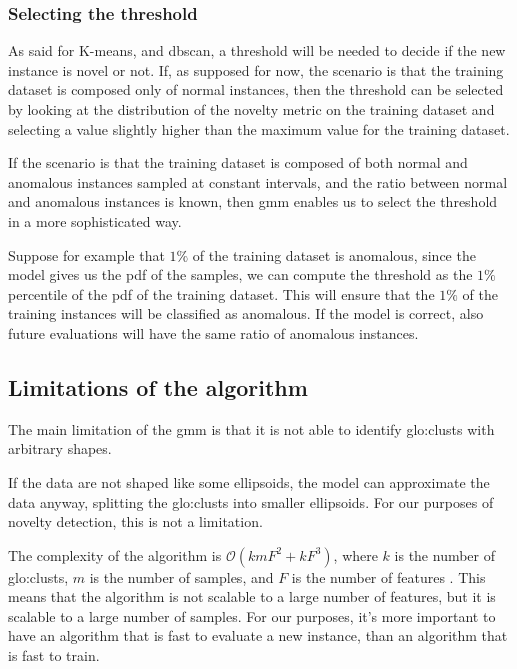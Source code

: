 \subsubsection{Selecting the threshold}
As said for K-means, and \gls{dbscan}, a threshold will be needed to decide if the new instance is novel or not. If, as supposed for now, the scenario is that the training dataset is composed only of normal instances, then the threshold can be selected by looking at the distribution of the novelty metric on the training dataset and selecting a value slightly higher than the maximum value for the training dataset.

If the scenario is that the training dataset is composed of both normal and anomalous instances sampled at constant intervals, and the ratio between normal and anomalous instances is known, then \gls{gmm} enables us to select the threshold in a more sophisticated way.

Suppose for example that $1\%$ of the training dataset is anomalous, since the model gives us the \gls{pdf} of the samples, we can compute the threshold as the $1\%$ percentile of the \gls{pdf} of the training dataset. This will ensure that the $1\%$ of the training instances will be classified as anomalous. If the model is correct, also future evaluations will have the same ratio of anomalous instances.

\subsection{Limitations of the algorithm}
The main limitation of the \gls{gmm} is that it is not able to identify \gls{glo:clust}s with arbitrary shapes.

If the data are not shaped like some ellipsoids, the model can approximate the data anyway, splitting the \gls{glo:clust}s into smaller ellipsoids. For our purposes of novelty detection, this is not a limitation.

The complexity of the algorithm is $\mathcal{O}(kmF^2+kF^3)$, where $k$ is the number of \gls{glo:clust}s, $m$ is the number of samples, and $F$ is the number of features . This means that the algorithm is not scalable to a large number of features, but it is scalable to a large number of samples.
For our purposes, it's more important to have an algorithm that is fast to evaluate a new instance, than an algorithm that is fast to train.